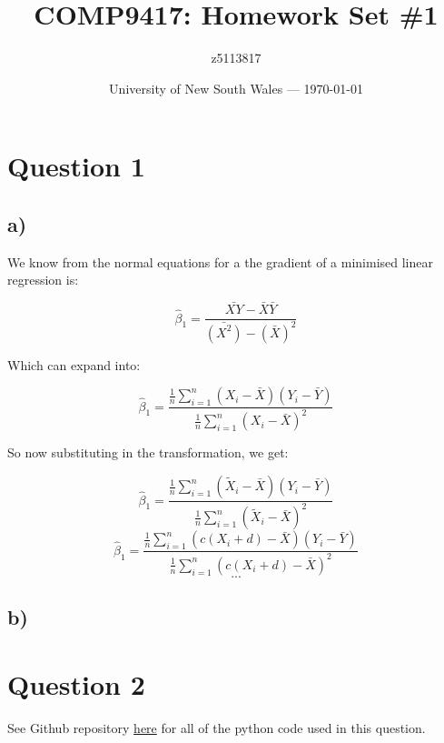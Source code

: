 \documentclass{article}
\title{COMP9417: Homework Set \#1} %
\author{z5113817} %
\date{University of New South Wales --- \today} %
\newcommand\simplelrg{\hat{\beta}_{1} = \frac{\bar{XY} - \bar{X}\bar{Y}}{\bar{(X^2)} - (\bar{X})^2}}
\newcommand\sumlrg{\frac{1}{n}\sum_{i=1}^{n}(}
\newcommand\expandedlrg{\hat{\beta}_{1} = \frac{\sumlrg{}X_{i} - \bar{X})(Y_{i} - \bar{Y})}{\sumlrg{}X_{i} - \bar{X})^2}}
\begin{document}
\maketitle %


\section*{Question 1}

\subsection*{a)}

We know from the normal equations for a the gradient of a minimised linear regression is:

\begin{equation*}
	\simplelrg{}
\end{equation*}

Which can expand into:

\begin{equation*}
	\expandedlrg{}
\end{equation*}

So now substituting in the transformation, we get:

\begin{equation}
	\hat{\beta}_{1} = \frac{\sumlrg{}\tilde{X}_{i} - \bar{X})(Y_{i} - \bar{Y})}{\sumlrg{}\tilde{X}_{i} - \bar{X})^2}
\end{equation}
\begin{equation}
	\hat{\beta}_{1} = \frac{\sumlrg{}c(X_{i} + d) - \bar{X})(Y_{i} - \bar{Y})}{\sumlrg{}c(X_{i} + d) - \bar{X})^2}
\end{equation}
\begin{equation}
	...
\end{equation}

\subsection*{b)}

\newpage
\section*{Question 2}

See Github repository \href{https://github.com/william-coulter/COMP9417_Homework_1/tree/master/python}{here} for all of the python code used in this question.
\end{document}
